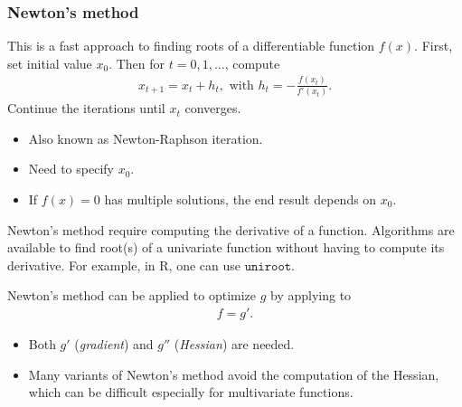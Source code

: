 

\begin{frame}
  \frametitle{Newton's method}
  This is a fast approach to finding roots of a differentiable
  function $f(x)$.  First, set initial value $x_0$.  Then for
  $t=0,1,\ldots$, compute
  \begin{align*}
    x_{t+1} = x_t + h_t, \text{ with } h_t=
    - \frac{f(x_t)}{f'(x_t)}.
  \end{align*}
  Continue the iterations until $x_t$ converges.
  \begin{itemize}
  \item Also known as Newton-Raphson iteration.
  \item Need to specify $x_0$.
  \item If $f(x)=0$ has multiple solutions, the end result depends
    on $x_0$.
  \end{itemize}


  \end{frame}

  \begin{frame}
  Newton's method require computing the derivative of a function.
  Algorithms are available to find root(s) of a univariate function
  without having to compute its derivative.  For example, in R, one
  can use $\texttt{uniroot}$.

  Newton's method can be applied to optimize $g$ by applying to
  \begin{align*}
    f=g'.
  \end{align*}
  \begin{itemize}
  \item Both $g'$ (\emph{gradient\/}) and $g''$ (\emph{Hessian\/}) are
    needed.
  \item Many variants of Newton's method avoid the computation of
    the Hessian, which can be difficult especially for multivariate
    functions.
  \end{itemize}

  \end{frame}


